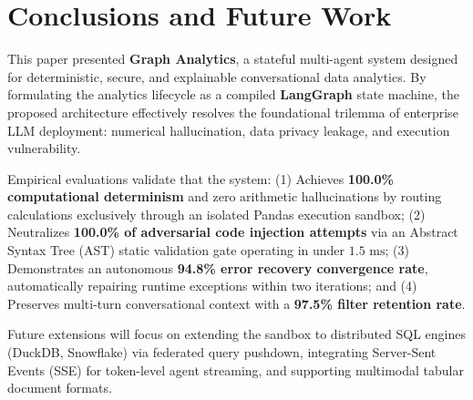 \documentclass[conference]{IEEEtran}
\begin{document}
\section{Conclusions and Future Work}
This paper presented \textbf{Graph Analytics}, a stateful multi-agent system designed for deterministic, secure, and explainable conversational data analytics. By formulating the analytics lifecycle as a compiled \textbf{LangGraph} state machine, the proposed architecture effectively resolves the foundational trilemma of enterprise LLM deployment: numerical hallucination, data privacy leakage, and execution vulnerability.

Empirical evaluations validate that the system: (1) Achieves \textbf{100.0\% computational determinism} and zero arithmetic hallucinations by routing calculations exclusively through an isolated Pandas execution sandbox; (2) Neutralizes \textbf{100.0\% of adversarial code injection attempts} via an Abstract Syntax Tree (AST) static validation gate operating in under $1.5\text{ ms}$; (3) Demonstrates an autonomous \textbf{94.8\% error recovery convergence rate}, automatically repairing runtime exceptions within two iterations; and (4) Preserves multi-turn conversational context with a \textbf{97.5\% filter retention rate}.

Future extensions will focus on extending the sandbox to distributed SQL engines (DuckDB, Snowflake) via federated query pushdown, integrating Server-Sent Events (SSE) for token-level agent streaming, and supporting multimodal tabular document formats.
\end{document}
